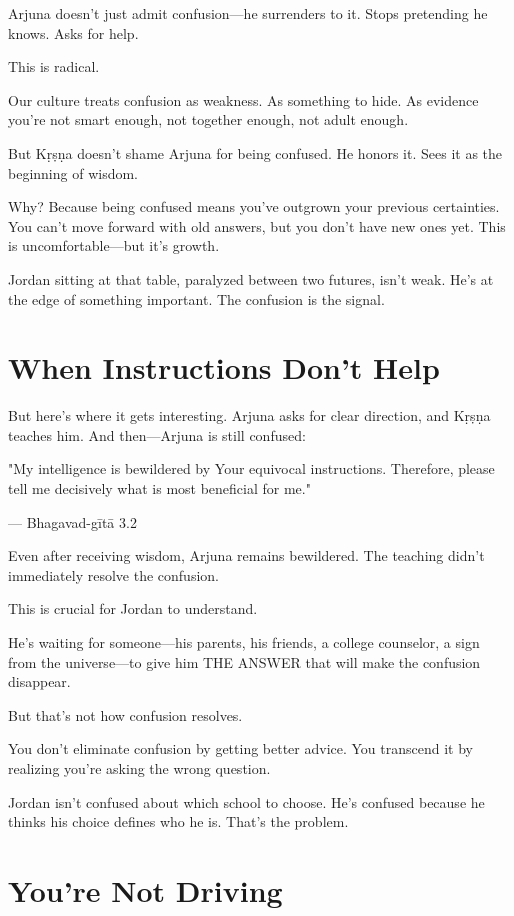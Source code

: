 \documentclass[11pt,twoside]{book}
\begin{document}
Arjuna doesn't just admit confusion—he surrenders to it. Stops pretending he knows. Asks for help.

This is radical.

Our culture treats confusion as weakness. As something to hide. As evidence you're not smart enough, not together enough, not adult enough.

But Kṛṣṇa doesn't shame Arjuna for being confused. He honors it. Sees it as the beginning of wisdom.

Why? Because being confused means you've outgrown your previous certainties. You can't move forward with old answers, but you don't have new ones yet. This is uncomfortable—but it's growth.

Jordan sitting at that table, paralyzed between two futures, isn't weak. He's at the edge of something important. The confusion is the signal.

\section*{When Instructions Don't Help}

But here's where it gets interesting. Arjuna asks for clear direction, and Kṛṣṇa teaches him. And then—Arjuna is still confused:

\begin{pullquote}
"My intelligence is bewildered by Your equivocal instructions. Therefore, please tell me decisively what is most beneficial for me."

--- Bhagavad-gītā 3.2
\end{pullquote}

Even after receiving wisdom, Arjuna remains bewildered. The teaching didn't immediately resolve the confusion.

This is crucial for Jordan to understand.

He's waiting for someone—his parents, his friends, a college counselor, a sign from the universe—to give him THE ANSWER that will make the confusion disappear.

But that's not how confusion resolves.

You don't eliminate confusion by getting better advice. You transcend it by realizing you're asking the wrong question.

Jordan isn't confused about which school to choose. He's confused because he thinks his choice defines who he is. That's the problem.

\section*{You're Not Driving}
\end{document}
